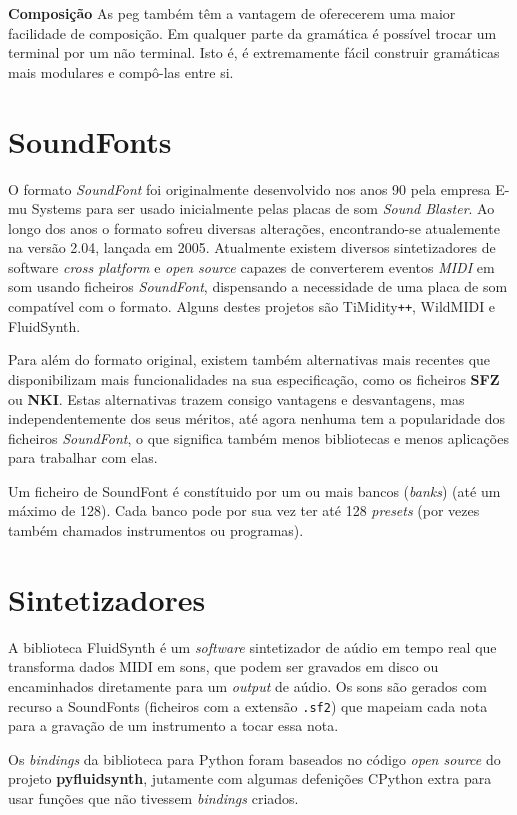\documentclass[
  oneside,
  11pt, a4paper,
  footinclude=true,
  headinclude=true,
  cleardoublepage=empty
]{scrbook}
\begin{document}
\textbf{Composição} As \acrlong{peg} também têm a vantagem de oferecerem uma maior facilidade de composição. Em qualquer parte da gramática é possível trocar um terminal por um não terminal. Isto é, é extremamente fácil construir gramáticas mais modulares e compô-las entre si.

    \section{SoundFonts}
    O formato \textit{SoundFont} foi originalmente desenvolvido nos anos 90 pela empresa E-mu Systems para ser usado inicialmente pelas placas de som \textit{Sound Blaster}. Ao longo dos anos o formato sofreu diversas alterações, encontrando-se atualemente na versão 2.04, lançada em 2005\cite{soundfont}. Atualmente existem diversos sintetizadores de software \textit{cross platform} e \textit{open source} capazes de converterem eventos \textit{MIDI} em som usando ficheiros \textit{SoundFont}, dispensando a necessidade de uma placa de som compatível com o formato. Alguns destes projetos são TiMidity\verb|++|, WildMIDI e FluidSynth.
    
    Para além do formato original, existem também alternativas mais recentes que disponibilizam mais funcionalidades na sua especificação, como os ficheiros \textbf{SFZ} ou \textbf{NKI}. Estas alternativas trazem consigo vantagens e desvantagens, mas independentemente dos seus méritos, até agora nenhuma tem a popularidade dos ficheiros \textit{SoundFont}, o que significa também menos bibliotecas e menos aplicações para trabalhar com elas.

Um ficheiro de SoundFont é constítuido por um ou mais bancos (\textit{banks}) (até um máximo de 128). Cada banco pode por sua vez ter até 128 \textit{presets} (por vezes também chamados instrumentos ou programas).
	\section{Sintetizadores}
	A biblioteca FluidSynth é um \textit{software} sintetizador de aúdio em tempo real que transforma dados MIDI em sons, que podem ser gravados em disco ou encaminhados diretamente para um \textit{output} de aúdio. Os sons são gerados com recurso a SoundFonts\cite{soundfont} (ficheiros com a extensão \texttt{.sf2}) que mapeiam cada nota para a gravação de um instrumento a tocar essa nota.

Os \textit{bindings} da biblioteca para Python foram baseados no código \textit{open source} do projeto \textbf{pyfluidsynth}\cite{pyfluidsynth}, jutamente com algumas defenições CPython extra para usar funções que não tivessem \textit{bindings} criados.
\end{document}
